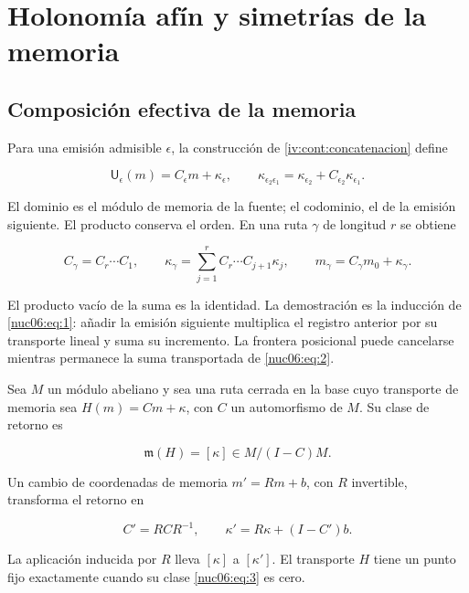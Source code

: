 \section{Holonomía afín y simetrías de la memoria}
\label{nuclear:6}
\subsection{Composición efectiva de la memoria}

Para una emisión admisible \(\epsilon\), la construcción de \cref{iv:cont:concatenacion} define

\begin{equation}
\mathsf U_\epsilon(m)=C_\epsilon m+\kappa_\epsilon,
\qquad
\kappa_{\epsilon_2\epsilon_1}
=\kappa_{\epsilon_2}+C_{\epsilon_2}\kappa_{\epsilon_1}.
\label{nuc06:eq:1}
\end{equation}

El dominio es el módulo de memoria de la fuente; el codominio, el de la emisión siguiente. El producto conserva el orden. En una ruta \(\gamma\) de longitud \(r\) se obtiene

\begin{equation}
C_\gamma=C_r\cdots C_1,\qquad
\kappa_\gamma=\sum_{j=1}^r C_r\cdots C_{j+1}\kappa_j,
\qquad
m_\gamma=C_\gamma m_0+\kappa_\gamma.
\label{nuc06:eq:2}
\end{equation}

El producto vacío de la suma es la identidad. La demostración es la inducción de \eqref{nuc06:eq:1}: añadir la emisión siguiente multiplica el registro anterior por su transporte lineal y suma su incremento. La frontera posicional puede cancelarse mientras permanece la suma transportada de \eqref{nuc06:eq:2}.

\begin{proposition}

Sea \(M\) un módulo abeliano y sea una ruta cerrada en la base cuyo transporte de memoria sea \(H(m)=Cm+\kappa\), con \(C\) un automorfismo de \(M\). Su clase de retorno es

\begin{equation}
\mathfrak m(H)=[\kappa]\in M/(I-C)M.
\label{nuc06:eq:3}
\end{equation}

Un cambio de coordenadas de memoria \(m'=Rm+b\), con \(R\) invertible, transforma el retorno en

\begin{equation}
C'=RCR^{-1},\qquad
\kappa'=R\kappa+(I-C')b.
\label{nuc06:eq:4}
\end{equation}

La aplicación inducida por \(R\) lleva \([\kappa]\) a \([\kappa']\). El transporte \(H\) tiene un punto fijo exactamente cuando su clase \eqref{nuc06:eq:3} es cero.
\end{proposition}


